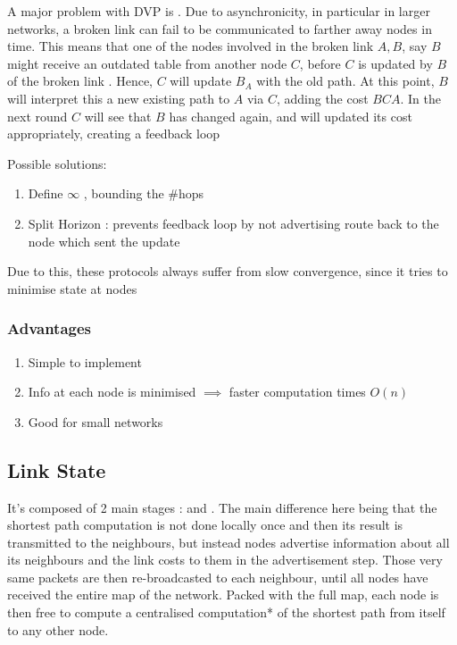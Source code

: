 \par{A major problem with DVP is  . Due to asynchronicity, in particular in larger networks, a broken link can fail to be communicated to farther away nodes in time. This means that one of the nodes involved in the broken link $A,B$, say $B$ might receive an outdated table from another node $C$, before $C$ is updated by $B$ of the broken link . Hence, $C$ will update $B_{A}$ with the old path. At this point, $B$ will interpret this a new existing path to $A$ via $C$, adding the cost $BCA$. In the next round $C$ will see that $B$ has changed again, and will updated its cost appropriately, creating a feedback loop}

\par{Possible solutions:}

\begin{enumerate}
	\item Define $\infty$ , bounding the \#hops
	\item Split Horizon : prevents feedback loop by not advertising route back to the node which sent the update
\end{enumerate}

\par{Due to this, these protocols always suffer from slow convergence, since it tries to minimise state at nodes}

\subsubsection{Advantages}

\begin{enumerate}
	\item Simple to implement
	\item Info at each node is minimised $\implies$ faster computation times $O(n)$
	\item Good for small networks
\end{enumerate}

\subsection{Link State}

\par{It's composed of 2 main stages :  and . The main difference here being that the shortest path computation is not done  locally once and then its result is transmitted to the neighbours, but instead nodes advertise information about all its neighbours and the link costs to them in the ad­vertisement step. Those very same packets are then re-broadcasted to each neighbour, until all nodes have received the entire map of the network. Packed with the full map, each node is then free to compute a centralised computation* of the shortest path from itself to any other node.}


